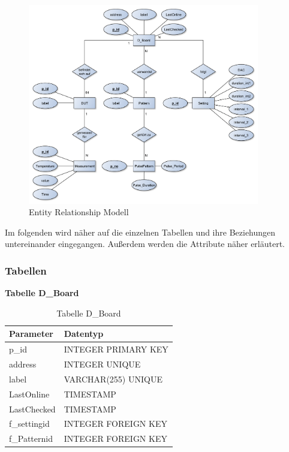 \begin{figure}[H]
\begin{center}
\includegraphics[width=0.9\textwidth]{img/general/ER_Diagramm.pdf}
\caption{Entity Relationship Modell}
\label{ERM}
\end{center}
\end{figure}

Im folgenden wird näher auf die einzelnen Tabellen und ihre Beziehungen untereinander eingegangen. Außerdem werden die Attribute näher erläutert.

\newpage
\subsubsection{Tabellen}

\textbf{Tabelle D\_Board}\\

\begin{table}[H]
\begin{center}
\begin{tabular}{|l|l|}\hline
Parameter & Datentyp \\ \hline
p\_id & INTEGER PRIMARY KEY\\ 
address & INTEGER UNIQUE\\ 
label & VARCHAR(255) UNIQUE\\ 
LastOnline & TIMESTAMP\\ 
LastChecked & TIMESTAMP\\ 
f\_settingid & INTEGER FOREIGN KEY\\
f\_Patternid & INTEGER FOREIGN KEY\\ \hline
\end{tabular}
\caption{Tabelle D\_Board}
\label{table_TabelleD_Board}
\end{center}
\end{table}



